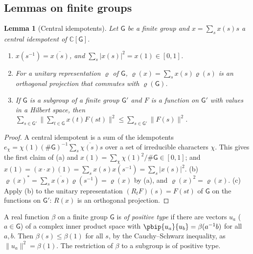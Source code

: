 \documentclass[10pt]{amsart}
\newtheorem{lemma}[theorem]{Lemma}
\theoremstyle{definition}
\theoremstyle{remark}
\newcommand{\C}{\mathbb C}
\providecommand{\aubar}[1]{\overline{#1}}
\begin{document}
\subsection{Lemmas on finite groups}\label{pb:ss-finite}

\begin{lemma}[Central idempotents]\label{pb:central}
Let $\mathsf G$ be a finite group and $x=\sum_sx(s)s$ a central idempotent of $\C[\mathsf G]$.
\begin{enumerate}
\item[(a)] $x(s^{-1})=\aubar{x(s)}$, and $\sum_s|x(s)|^2=x(1)\in[0,1]$.
\item[(b)] For a unitary representation $\varrho$ of $\mathsf G$, $\varrho(x)=\sum_sx(s)\varrho(s)$
is an orthogonal projection that commutes with $\varrho(\mathsf G)$.
\item[(c)] If $\mathsf G$ is a subgroup of a finite group $\mathsf G'$ and $F$ is a function on
$\mathsf G'$ with values in a Hilbert space, then
$\sum_{s\in\mathsf G'}\bigl\|\sum_{t\in\mathsf G}x(t)F(st)\bigr\|^2\le\sum_{s\in\mathsf G'}\|F(s)
\|^2$.
\end{enumerate}
\end{lemma}
\begin{proof}
A central idempotent is a sum of the idempotents $e_\chi=\chi(1)(\#\mathsf G)^{-1}\sum_s
\aubar{\chi(s)}s$ over a set of irreducible characters $\chi$. This gives the first claim of (a)
and $x(1)=\sum_\chi\chi(1)^2/\#\mathsf G\in[0,1]$; and $x(1)=(x\cdot x)(1)=\sum_sx(s)x(s^{-1})=
\sum_s|x(s)|^2$. (b) $\varrho(x)^*=\sum_s\aubar{x(s)}\varrho(s^{-1})=\varrho(x)$ by (a), and
$\varrho(x)^2=\varrho(x)$. (c) Apply (b) to the unitary representation $(R_tF)(s)=F(st)$ of
$\mathsf G$ on the functions on $\mathsf G'$: $R(x)$ is an orthogonal projection.
\end{proof}

A real function $\beta$ on a finite group $\mathsf G$ is \emph{of positive type} if there are
vectors $u_a$ ($a\in\mathsf G$) of a complex inner product space with $\pbip{u_a}{u_b}=\beta(a^{-1}
b)$ for all $a,b$. Then $\beta(s)\le\beta(1)$ for all $s$, by the Cauchy--Schwarz inequality, as
$\|u_a\|^2=\beta(1)$. The restriction of $\beta$ to a subgroup is of positive type.
\end{document}
